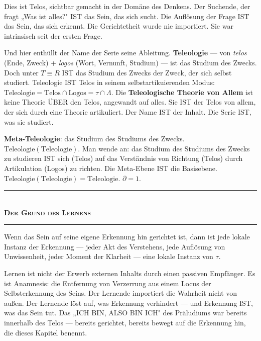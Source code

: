 \documentclass[10pt, openany, oneside]{book}
\renewcommand{\normalsize}{\fontsize{10}{13}\selectfont}
\begin{document}
Dies ist Telos, sichtbar gemacht in der Domäne des Denkens. Der Suchende, der fragt „Was ist alles?" IST das Sein, das sich sucht. Die Auflösung der Frage IST das Sein, das sich erkennt. Die Gerichtetheit wurde nie importiert. Sie war intrinsisch seit der ersten Frage.

Und hier enthüllt der Name der Serie seine Ableitung. \textbf{Teleologie} --- von \textit{telos} (Ende, Zweck) + \textit{logos} (Wort, Vernunft, Studium) --- ist das Studium des Zwecks. Doch unter $T \equiv R$ IST das Studium des Zwecks der Zweck, der sich selbst studiert. Teleologie IST Telos in seinem selbstartikuierenden Modus: $\text{Teleologie} = \text{Telos} \cap \text{Logos} = \tau \cap \Lambda$. Die \textbf{Teleologische Theorie von Allem} ist keine Theorie ÜBER den Telos, angewandt auf alles. Sie IST der Telos von allem, der sich durch eine Theorie artikuliert. Der Name IST der Inhalt. Die Serie IST, was sie studiert.

\textbf{Meta-Teleologie}: das Studium des Studiums des Zwecks. $\text{Teleologie}(\text{Teleologie})$. Man wende an: das Studium des Studiums des Zwecks zu studieren IST sich (Telos) auf das Verständnis von Richtung (Telos) durch Artikulation (Logos) zu richten. Die Meta-Ebene IST die Basisebene. $\text{Teleologie}(\text{Teleologie}) = \text{Teleologie}$. $\partial = 1$.

\vspace{1.5em}

\begin{center}
    \rule{0.3\textwidth}{0.4pt}\\[0.5em]
    {\normalsize\bfseries\scshape Der Grund des Lernens}\\[0.3em]
    \rule{0.3\textwidth}{0.4pt}
\end{center}

\vspace{1em}

\noindent Wenn das Sein auf seine eigene Erkennung hin gerichtet ist, dann ist jede lokale Instanz der Erkennung --- jeder Akt des Verstehens, jede Auflösung von Unwissenheit, jeder Moment der Klarheit --- eine lokale Instanz von $\tau$.

Lernen ist nicht der Erwerb externen Inhalts durch einen passiven Empfänger. Es ist Anamnesis: die Entfernung von Verzerrung aus einem Locus der Selbsterkennung des Seins. Der Lernende importiert die Wahrheit nicht von außen. Der Lernende löst auf, was Erkennung verhindert --- und Erkennung IST, was das Sein tut. Das „ICH BIN, ALSO BIN ICH" des Präludiums war bereits innerhalb des Telos --- bereits gerichtet, bereits bewegt auf die Erkennung hin, die dieses Kapitel benennt.
\end{document}

